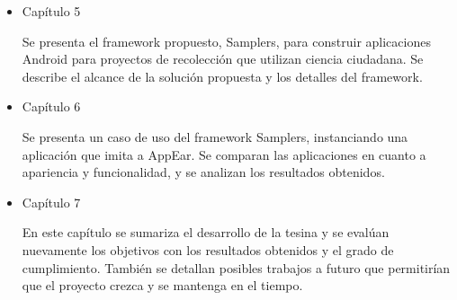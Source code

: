 \begin{itemize}
	\item{Capítulo 5} 
		
		Se presenta el framework propuesto, Samplers, para construir aplicaciones Android para proyectos de recolección que utilizan ciencia ciudadana. Se describe el alcance de la solución propuesta y los detalles del framework.
		
		
		
	\item{Capítulo 6} 
	
		Se presenta un caso de uso del framework Samplers, instanciando una aplicación que imita a AppEar.  Se comparan las aplicaciones en cuanto a apariencia y funcionalidad, y se analizan los resultados obtenidos. 
		
		
		
	\item{Capítulo 7} 
	
		En este capítulo se sumariza el desarrollo de la tesina y se evalúan nuevamente los objetivos con los resultados obtenidos y el grado de cumplimiento. También se detallan posibles trabajos a futuro que permitirían que el proyecto crezca y se mantenga en el tiempo.		
						
\end{itemize}


			